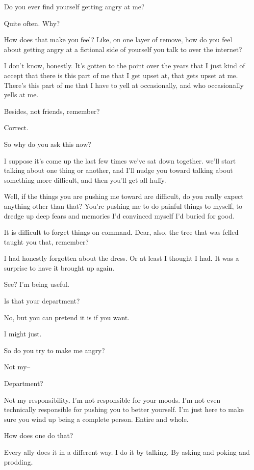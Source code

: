 \begin{ally}
Do you ever find yourself getting angry at me?
\end{ally}
Quite often. Why?

\begin{ally}
How does that make you feel? Like, on one layer of remove, how do you feel about getting angry at a fictional side of yourself you talk to over the internet?
\end{ally}
I don't know, honestly. It's gotten to the point over the years that I just kind of accept that there is this part of me that I get upset at, that gets upset at me. There's this part of me that I have to yell at occasionally, and who occasionally yells at me.

Besides, not friends, remember?

\begin{ally}
Correct.
\end{ally}
So why do you ask this now?

\begin{ally}
I suppose it's come up the last few times we've sat down together. we'll start talking about one thing or another, and I'll nudge you toward talking about something more difficult, and then you'll get all huffy.
\end{ally}
Well, if the things you are pushing me toward are difficult, do you really expect anything other than that? You're pushing me to do painful things to myself, to dredge up deep fears and memories I'd convinced myself I'd buried for good.

\begin{ally}
It is difficult to forget things on command. Dear, also, the tree that was felled taught you that, remember?
\end{ally}
I had honestly forgotten about the dress. Or at least I thought I had. It was a surprise to have it brought up again.

\begin{ally}
See? I'm being useful.
\end{ally}
Is that your department?

\begin{ally}
No, but you can pretend it is if you want.
\end{ally}
I might just.

So do you try to make me angry?

\begin{ally}
Not my--
\end{ally}
Department?

\begin{ally}
Not my responsibility. I'm not responsible for your moods. I'm not even technically responsible for pushing you to better yourself. I'm just here to make sure you wind up being a complete person. Entire and whole.
\end{ally}
How does one do that?

\begin{ally}
Every ally does it in a different way. I do it by talking. By asking and poking and prodding.
\end{ally}
\newpage
